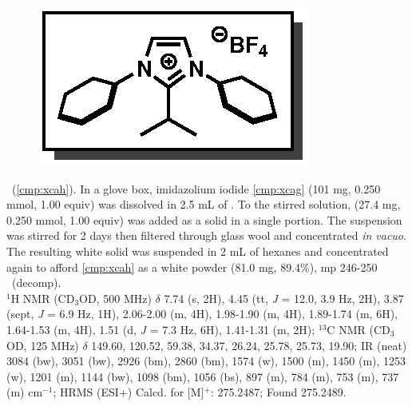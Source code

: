 \vspace{10pt}
\begin{figure}
  \vspace{-25pt}
  \begin{center}
    \includegraphics[scale=0.8]{chp_alkylation/images/xcah}
  \end{center}
  \vspace{-30pt}
\end{figure}
\noindent \textbf{\CMPxcah}\ (\ref{cmp:xcah}). In a glove box, imidazolium iodide \ref{cmp:xcag}
(101 mg, 0.250 mmol, 1.00 equiv) was dissolved in 2.5 mL of . To the stirred solution,
 (27.4 mg, 0.250 mmol, 1.00 equiv) was added as a solid in a single portion. The
suspension was stirred for 2 days then filtered through glass wool and concentrated \textit{in
vacuo}.
The resulting white solid was suspended in 2 mL of hexanes and concentrated again to afford \ref{cmp:xcah} as a
white powder (81.0 mg, 89.4\%), mp 246-250 \degc~(decomp). 
\\
$^1$H NMR (CD$_3$OD, 500 MHz) $\delta$ 7.74 (s, 2H), 4.45 (tt, \textit{J} = 12.0, 3.9 Hz, 2H), 3.87
(sept, \textit{J} = 6.9 Hz, 1H), 2.06-2.00 (m, 4H), 1.98-1.90 (m, 4H), 1.89-1.74 (m, 6H),
1.64-1.53 (m, 4H), 1.51 (d, \textit{J} = 7.3 Hz, 6H), 1.41-1.31 (m, 2H); $^{13}$C NMR (CD$_3$OD, 125
MHz) $\delta$ 149.60, 120.52, 59.38, 34.37, 26.24, 25.78, 25.73, 19.90; IR (neat)  3084 (bw), 3051 (bw), 2926 (bm), 2860 (bm), 1574 (w), 1500 (m), 1450 (m), 1253 (w), 1201 (m), 1144 (bw), 1098 (bm), 1056 (bs), 897 (m), 784 (m), 753 (m), 737 (m) cm$^{-1}$; HRMS
(ESI+) Calcd.
for  [M]$^+$:
275.2487; Found 275.2489.


